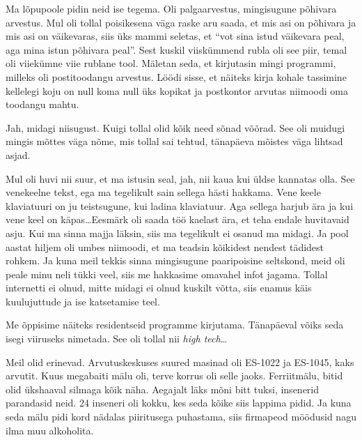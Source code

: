 
Ma lõpupoole pidin neid ise tegema. Oli palgaarvestus, mingisugune põhivara 
arvestus. Mul oli tollal poisikesena väga raske aru saada, et mis asi on 
põhivara ja mis asi on väikevaras, siis üks mammi seletas, et \enquote{vot sina 
istud väikevara peal, aga mina istun põhivara peal}. Sest kuskil viiskümmend 
rubla oli see piir, temal oli  viiekümne viie rublane tool. Mäletan seda, et 
kirjutasin mingi programmi, milleks oli postitoodangu arvestus. Löödi sisse, et 
 näiteks kirja kohale tassimine kellelegi koju on null koma null üks kopikat ja 
postkontor arvutas niimoodi oma toodangu mahtu. 


Jah, midagi niisugust. Kuigi tollal olid kõik need sõnad võõrad. See oli 
muidugi mingis mõttes väga nõme, mis tollal sai tehtud, tänapäeva mõistes väga 
lihtsad asjad. 


Mul oli huvi nii suur, et ma istusin seal, jah, nii kaua kui  üldse kannatas 
olla. See venekeelne tekst, ega ma tegelikult sain sellega hästi hakkama. Vene 
keele klaviatuuri on ju teistsugune, kui ladina klaviatuur. Aga sellega harjub 
ära ja kui vene keel on käpas\ldots Eesmärk oli saada töö kaelast ära, et teha 
endale huvitavaid asju. Kui ma sinna majja läksin, siis ma tegelikult ei osanud 
ma midagi. Ja pool aastat hiljem oli umbes niimoodi, et ma teadsin kõikidest 
nendest tädidest rohkem. Ja kuna meil tekkis sinna mingisugune paaripoisine 
seltskond, meid oli  peale minu neli tükki veel, siis me  hakkasime omavahel 
infot jagama. Tollal internetti ei olnud, mitte midagi ei olnud kuskilt võtta, 
siis enamus käis kuulujuttude ja ise katsetamise teel. 

Me õppisime näiteks residentseid programme kirjutama. Tänapäeval võiks seda 
isegi viiruseks nimetada.  See oli tollal nii \emph{high tech}\ldots


Meil olid erinevad. Arvutuskeskuses suured masinad oli ES-1022 ja ES-1045, kaks arvutit. Kuus megabaiti 
mälu oli, terve korrus oli selle jaoks. Ferriitmälu, bitid olid ükshaaval 
silmaga kõik näha. Aegajalt läks mõni bitt tuksi,  insenerid parandasid neid. 
24 inseneri oli kokku, kes seda kõike siis lappima pidid. Ja kuna seda mälu 
pidi kord nädalas piiritusega puhastama, siis firmapeod möödusid nagu ilma muu 
alkoholita.  

